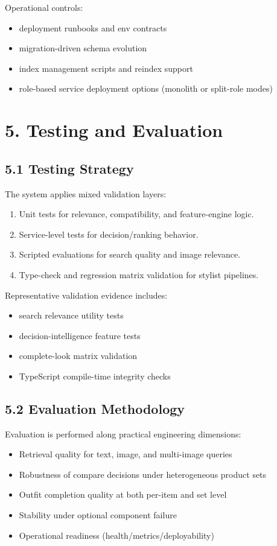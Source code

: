 \documentclass[12pt,a4paper]{report}
\begin{document}
Operational controls:

\begin{itemize}
\item deployment runbooks and env contracts
\item migration-driven schema evolution
\item index management scripts and reindex support
\item role-based service deployment options (monolith or split-role modes)
\end{itemize}

\chapter{5. Testing and Evaluation}
\section{5.1 Testing Strategy}
The system applies mixed validation layers:

\begin{enumerate}
\item Unit tests for relevance, compatibility, and feature-engine logic.
\item Service-level tests for decision/ranking behavior.
\item Scripted evaluations for search quality and image relevance.
\item Type-check and regression matrix validation for stylist pipelines.
\end{enumerate}

Representative validation evidence includes:

\begin{itemize}
\item search relevance utility tests
\item decision-intelligence feature tests
\item complete-look matrix validation
\item TypeScript compile-time integrity checks
\end{itemize}

\section{5.2 Evaluation Methodology}
Evaluation is performed along practical engineering dimensions:

\begin{itemize}
\item Retrieval quality for text, image, and multi-image queries
\item Robustness of compare decisions under heterogeneous product sets
\item Outfit completion quality at both per-item and set level
\item Stability under optional component failure
\item Operational readiness (health/metrics/deployability)
\end{itemize}
\end{document}

